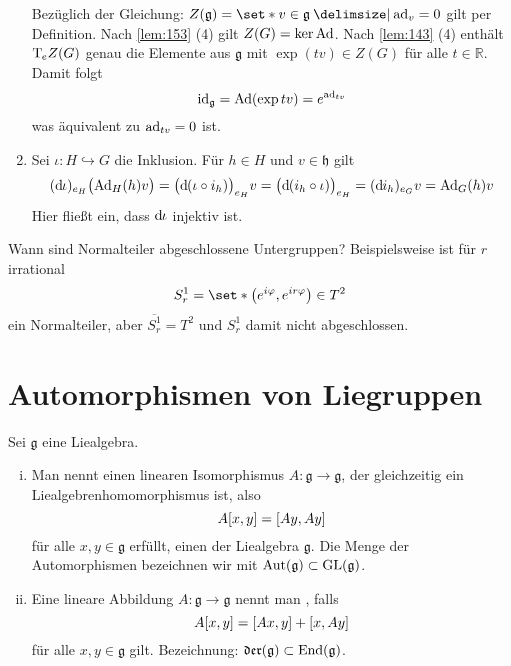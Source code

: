 \begin{beweis}
\begin{enumerate}[1)]
		Bezüglich der Gleichung: $Z(\mathfrak{g}) = \set*{v \in \mathfrak{g} \given \ad_v =0}$ gilt per Definition.
		Nach \autoref{lem:153} (4) gilt $Z(G) = \ker \Ad$.
		Nach \autoref{lem:143} (4) enthält $\Tmap_e Z(G)$ genau die Elemente aus $\mathfrak{g}$ mit $\exp(tv) \in Z(G)$ für alle $t \in \mathbb{R}$.
		Damit folgt
		\[
			 \id_{\mathfrak{g}}=\Ad (\exp tv) =  e^{\ad_{tv}}
		\]
		was äquivalent zu $\ad_{tv}=0$ ist.
		\item Sei $\iota \colon H \hookrightarrow G$ die Inklusion.
		Für $h \in H$ und $v \in \mathfrak{h}$ gilt
		\[
			(\mathd \iota)_{e_H} \enbrace[\big]{\Ad_H(h)v} = \enbrace[\big]{\mathd(\iota \circ i_h)}_{e_H} v=\enbrace[\big]{\mathd(i_h \circ \iota)}_{e_H} = (\mathd i_h)_{e_G} v = \Ad_G(h) v
		\]
		Hier fließt ein, dass $\mathd \iota$ injektiv ist.\qedhere
	\end{enumerate}
\end{beweis}

\begin{frage}[{name=[Sind Normalteiler abgeschlossen?]}]
	Wann sind Normalteiler abgeschlossene Untergruppen?
	Beispielsweise ist für $r$ irrational
	\[
		S^1_r = \set*{\enbrace*{e^{i \varphi}, e^{i r \varphi}} \in T^2}
	\]
	ein Normalteiler, aber $\overline{S^1_r}=T^2$ und $S^1_r$ damit nicht abgeschlossen.
\end{frage}

\section{Automorphismen von Liegruppen} %
\label{sec:16}
\begin{definition}[{name=[Automorphismen und Derivationen]}]
	Sei $\mathfrak{g}$ eine Liealgebra.
	\begin{enumerate}[(i)]
		\item Man nennt einen linearen Isomorphismus $A \colon \mathfrak{g} \to \mathfrak{g}$, der gleichzeitig ein Liealgebrenhomomorphismus ist, also
		\[
			A \benbrace*{x,y} = \benbrace*{Ay,Ay}
		\]
		für alle $x,y \in \mathfrak{g}$ erfüllt, einen  der Liealgebra $\mathfrak{g}$.
		Die Menge der Automorphismen bezeichnen wir mit $\Aut(\mathfrak{g}) \subset \GL(\mathfrak{g})$.
		\item Eine lineare Abbildung $A \colon \mathfrak{g} \to \mathfrak{g}$ nennt man , falls 
		\[
			A \benbrace*{x,y} = \benbrace*{Ax,y} + \benbrace*{x,Ay}
		\] 
		für alle $x,y \in \mathfrak{g}$ gilt. Bezeichnung: $\Der(\mathfrak{g}) \subset \End(\mathfrak{g})$.
	\end{enumerate}
\end{definition}

